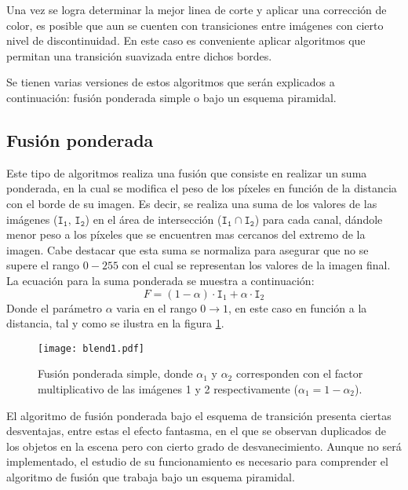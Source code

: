 Una vez se logra determinar la mejor linea de corte y aplicar una corrección de color, es posible que aun se cuenten con transiciones entre imágenes con cierto nivel de discontinuidad. En este caso es conveniente aplicar algoritmos que permitan una transición suavizada entre dichos bordes.

Se tienen varias versiones de estos algoritmos que serán explicados a continuación: fusión ponderada simple o bajo un esquema piramidal.

\subsection{Fusión ponderada} \label{feathering}
Este tipo de algoritmos realiza una fusión que consiste en realizar un suma ponderada, en la cual se modifica el peso de los píxeles en función de la distancia con el borde de su imagen. Es decir, se realiza una suma de los valores de las imágenes ($\mathtt{I_1},\, \mathtt{I_2}$) en el área de intersección ($\mathtt{I_1}\cap \mathtt{I_2}$) para cada canal, dándole menor peso a los píxeles que se encuentren mas cercanos del extremo de la imagen. Cabe destacar que esta suma se normaliza para asegurar que no se supere el rango $0-255$ con el cual se representan los valores de la imagen final. La ecuación para la suma ponderada se muestra a continuación:
\begin{displaymath}
	F = (1-\alpha)\cdot \mathtt{I}_1 + \alpha\cdot \mathtt{I}_2
\end{displaymath} 
Donde el parámetro $\alpha$ varia en el rango $0\to 1$, en este caso en función a la distancia, tal y como se ilustra en la figura \ref{imagen:blend-simple}.


\begin{figure}[h]
	\centering
	\texttt{[image: blend1.pdf]}
	\caption[Fusión ponderada simple]{Fusión ponderada simple, donde $\alpha_1$ y $\alpha_2$ corresponden con el factor multiplicativo de las imágenes 1 y 2 respectivamente ($\alpha_1 = 1 - \alpha_2$).}
	\label{imagen:blend-simple}
\end{figure}

El algoritmo de fusión ponderada bajo el esquema de transición presenta ciertas desventajas, entre estas el efecto fantasma, en el que se observan duplicados de los objetos en la escena pero con cierto grado de desvanecimiento. Aunque no será implementado, el estudio de su funcionamiento es necesario para comprender el algoritmo de fusión que trabaja bajo un esquema piramidal.

